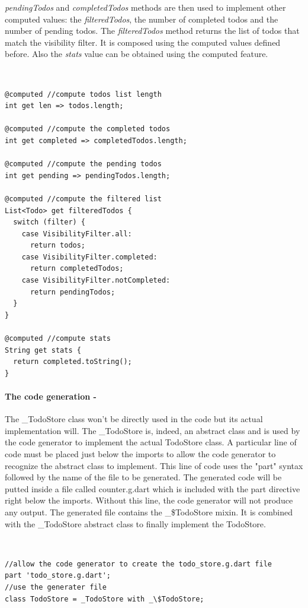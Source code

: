 \textit{pendingTodos} and \textit{completedTodos} methods are then used to implement other computed values: the \textit{filteredTodos}, the number of completed todos and the number of pending todos. The \textit{filteredTodos} method returns the list of todos that match the visibility filter. It is composed using the computed values defined before. Also the \textit{stats} value can be obtained using the computed feature.
\begin{code}
\mbox{}\\
 \mbox{}
		\label{code:2.14}
\begin{verbatim}
@computed //compute todos list length
int get len => todos.length;

@computed //compute the completed todos
int get completed => completedTodos.length;

@computed //compute the pending todos
int get pending => pendingTodos.length;

@computed //compute the filtered list
List<Todo> get filteredTodos {
  switch (filter) {
    case VisibilityFilter.all:
      return todos;
    case VisibilityFilter.completed:
      return completedTodos;
    case VisibilityFilter.notCompleted:
      return pendingTodos;
  }
}

@computed //compute stats
String get stats {
  return completed.toString();
}
\end{verbatim}
\mbox{}
\end{code}

\paragraph{The code generation - }
\label{subpar:todo_app_bloc_core_state}The \_TodoStore class won’t be directly used in the code but its actual implementation will. The \_TodoStore is, indeed, an abstract class and is used by the code generator to implement the actual TodoStore class. A particular line of code must be placed just below the imports to allow the code generator to recognize the abstract class to implement. This line of code uses the "part" syntax followed by the name of the file to be generated. The generated code will be putted inside a file called counter.g.dart which is included with the part directive right below the imports. Without this line, the code generator will not produce any output. The generated file contains the \_\$TodoStore mixin. It is combined with the \_TodoStore abstract class to finally implement the TodoStore.
\begin{code}
\mbox{}\\
 \mbox{}
		\label{code:2.14}
\begin{verbatim}
//allow the code generator to create the todo_store.g.dart file
part 'todo_store.g.dart';
//use the generater file
class TodoStore = _TodoStore with _\$TodoStore;
\end{verbatim}
\mbox{}
\end{code}

